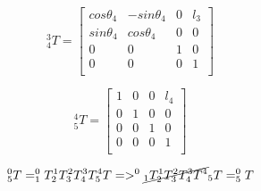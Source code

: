 \documentclass[transmag]{IEEEtran}
\begin{document}
\begin{eqfloat}
\begin{equation}
^3_4T =
\begin{bmatrix}
cos\theta_4 & -sin\theta_4 & 0      & l_3  \\
sin\theta_4 & cos\theta_4  & 0      & 0   \\
0           & 0            & 1      & 0   \\
0           & 0            & 0      & 1   \\
\end{bmatrix}
\end{equation}



\begin{equation}
^4_5T =
\begin{bmatrix}
1 & 0 & 0 & l_4  \\
0 & 1 & 0 & 0   \\
0 & 0 & 1 & 0   \\
0 & 0 & 0 & 1   \\
\end{bmatrix}
\end{equation}

\begin{equation}
^0_5T = ^0_1T  ^1_2T  ^2_3T  ^3_4T  ^4_5T => ^0 \cancel{_1T  ^1_2T  ^2_3T  ^3_4T  ^4} _5T = ^0_5T
\end{equation}

\end{eqfloat}
\end{document}
